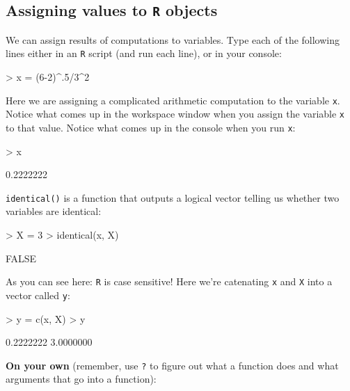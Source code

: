\documentclass{exam}
\begin{document}
\subsection{Assigning values to \texttt{R} objects}

We can assign results of computations to variables. Type each of the following lines either in an \texttt{R} script (and run each line), or in your console:
\begin{Schunk}
\begin{Sinput}
> x = (6-2)^.5/3^2
\end{Sinput}
\end{Schunk}
Here we are assigning a complicated arithmetic computation to the variable \texttt{x}. Notice what comes up in the workspace window when you assign the variable \texttt{x} to that value. Notice what comes up in the console when you run \texttt{x}:
\begin{Schunk}
\begin{Sinput}
> x
\end{Sinput}
\begin{Soutput}
[1] 0.2222222
\end{Soutput}
\end{Schunk}
\texttt{identical()} is a function that outputs a logical vector telling us whether two variables are identical:
\begin{Schunk}
\begin{Sinput}
> X = 3 
> identical(x, X)  
\end{Sinput}
\begin{Soutput}
[1] FALSE
\end{Soutput}
\end{Schunk}
As you can see here: \texttt{R} is case sensitive! Here we're catenating \texttt{x} and \texttt{X} into a vector called \texttt{y}:
\begin{Schunk}
\begin{Sinput}
> y = c(x, X)  
> y
\end{Sinput}
\begin{Soutput}
[1] 0.2222222 3.0000000
\end{Soutput}
\end{Schunk}

\noindent\textbf{On your own} (remember, use \texttt{?} to figure out what a function does and what arguments that go into a function):
\end{document}
